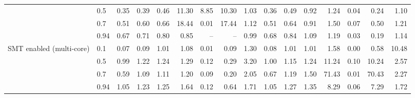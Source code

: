 \begin{table}
{\begin{tabular}{llrrrrrrrrrrrrrr}
 & 0.5 & 0.35 & 0.39 & 0.46 & 11.30 & 8.85 & 10.30 & 1.03 & 0.36 & 0.49 & 0.92 & 1.24 & 0.04 & 0.24 & 1.10 \\
 & 0.7 & 0.51 & 0.60 & 0.66 & 18.44 & 0.01 & 17.44 & 1.12 & 0.51 & 0.64 & 0.91 & 1.50 & 0.07 & 0.50 & 1.21 \\
 & 0.94 & 0.67 & 0.71 & 0.80 & 0.85 & -- & -- & 0.99 & 0.68 & 0.84 & 1.09 & 1.19 & 0.03 & 0.19 & 1.14 \\
\cmidrule{1-16}
\multirow[t]{4}{*}{SMT enabled (multi-core)} & 0.1 & 0.07 & 0.09 & 1.01 & 1.08 & 0.01 & 0.09 & 1.30 & 0.08 & 1.01 & 1.01 & 1.58 & 0.00 & 0.58 & 10.48 \\
 & 0.5 & 0.99 & 1.22 & 1.24 & 1.29 & 0.12 & 0.29 & 3.20 & 1.00 & 1.15 & 1.24 & 11.24 & 0.10 & 10.24 & 2.57 \\
 & 0.7 & 0.59 & 1.09 & 1.11 & 1.20 & 0.09 & 0.20 & 2.05 & 0.67 & 1.19 & 1.50 & 71.43 & 0.01 & 70.43 & 2.27 \\
 & 0.94 & 1.05 & 1.23 & 1.25 & 1.64 & 0.12 & 0.64 & 1.71 & 1.05 & 1.27 & 1.35 & 8.29 & 0.06 & 7.29 & 1.72 \\
\cmidrule{1-16}
\bottomrule
\end{tabular}%
}
\end{table}
